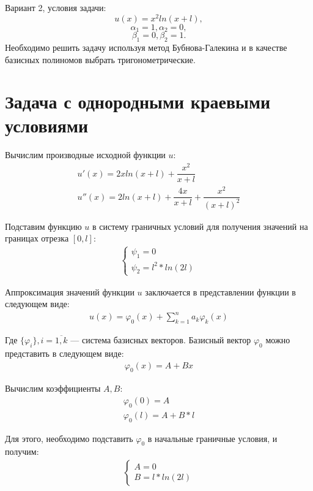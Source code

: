 \documentclass[12pt,a4paper,oneside]{extarticle}
\begin{document}
    Вариант 2, условия задачи:
    $$u(x) = x^2 ln(x+l),$$
    $$\alpha_1 = 1, \alpha_2 = 0,$$
    $$\beta_1 = 0, \beta_2 = 1.$$
    Необходимо решить задачу используя метод Бубнова-Галекина и в качестве базисных полиномов выбрать тригонометрические.

\section{Задача с однородными краевыми условиями}
    Вычислим производные исходной функции $u$:
    \begin{gather}
        u'(x) = 2xln(x+l) + \dfrac{x^2}{x+l} \nonumber \\
        u''(x) = 2ln(x+l) + \dfrac{4x}{x+l} + \dfrac{x^2}{(x+l)^2} \nonumber
    \end{gather}

    Подставим функцию $u$ в систему граничных условий для получения значений на границах отрезка $[0, l]$:
    \begin{gather}
        \begin{cases}
            \psi_1 = 0 \nonumber \\
            \psi_2 = l^2*ln(2l) \nonumber
        \end{cases}
    \end{gather}
        
    Аппроксимация значений функции $u$ заключается в представлении функции в следующем виде:
    \begin{gather}
        u(x) = \varphi_0(x) + \sum\limits_{k=1}^{n} a_k\varphi_k(x) \nonumber
    \end{gather}
    
    Где $\{\varphi_i\}, i = \overline{1,k}$ --- система базисных векторов. 
    Базисный вектор $\varphi_0$ можно представить в следующем виде:
    \begin{gather}
        \varphi_0(x) = A + Bx \nonumber
    \end{gather}
    
    Вычислим коэффициенты $A, B$: 
    \begin{gather}
        \varphi_0(0) = A \nonumber \\
        \varphi_0(l) = A + B*l \nonumber
    \end{gather}
    
    Для этого, необходимо подставить $\varphi_0$ в начальные граничные условия, и получим:
    \begin{gather}
        \begin{cases}
            A = 0 \nonumber \\
            B = l*ln(2l) \nonumber
        \end{cases}
    \end{gather}
    
\end{document}
